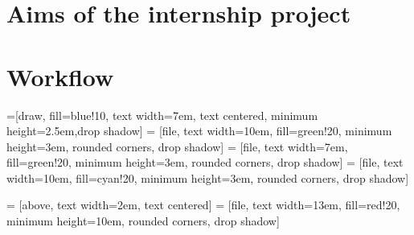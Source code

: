 \documentclass[12pt]{report}
\begin{document}
\section{Aims of the internship project}


\newpage
\section{Workflow}

=[draw, fill=blue!10, text width=7em, 
    text centered, minimum height=2.5em,drop shadow]
 = [file, text width=10em, fill=green!20, 
    minimum height=3em, rounded corners, drop shadow]
 = [file, text width=7em, fill=green!20, 
    minimum height=3em, rounded corners, drop shadow]
 = [file, text width=10em, fill=cyan!20, 
    minimum height=3em, rounded corners, drop shadow]   

 = [above, text width=2em, text centered]
 = [file, text width=13em, fill=red!20, 
    minimum height=10em, rounded corners, drop shadow]

\def\blockdist{2.5}
\def\edgedist{2.5}
\end{document}
